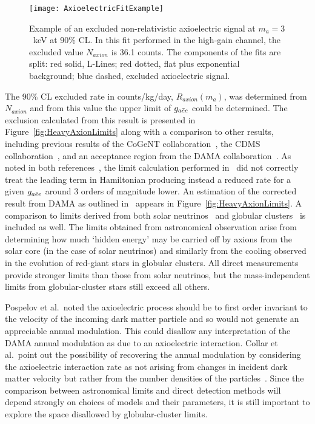 		\begin{figure}
			\centering
			\texttt{[image: AxioelectricFitExample]}
			\caption[Example of an excluded non-relativistic axioelectric signal at $m_{a}=3$~keV at 
			90\% CL]{Example of an excluded non-relativistic axioelectric signal at $m_{a}=3$~keV at 
			90\% CL.  In this fit performed in the high-gain channel, the excluded value $N_{axion}$ 
			is 36.1 counts.  
			The components of the fits are split: red solid, L-Lines; red dotted, flat plus exponential
			background; blue dashed, excluded axioelectric signal.}
			\label{fig:ExampleHeavyAxionFit}
		\end{figure}
			
	The 90\% CL excluded rate in counts/kg/day, $R_{axion}(m_{a})$, was determined from $N_{axion}$
and from this value the upper limit of $g_{a\bar{e}e}$ could be determined.  The exclusion calculated from this result is presented in Figure~\ref{fig:HeavyAxionLimits} 
along with a comparison to other results, including previous results of the CoGeNT collaboration~\cite{Aalseth:2008aa}, the CDMS 
collaboration~\cite{Ahmed2009}, and an acceptance region from the DAMA collaboration~\cite{Bernabei:2005ca}.  As noted in both 
references~\cite{Collar:2009sp,Pospelov:2008jk}, the limit calculation performed in~\cite{Bernabei:2005ca} did not correctly treat the 
leading term in Hamiltonian producing instead a reduced rate for a given $g_{a\bar{e}e}$ around 3 orders of magnitude lower.  An estimation 
of the corrected result from DAMA as outlined in~\cite{Collar:2009sp} appears in Figure~\ref{fig:HeavyAxionLimits}.  A comparison to 
limits derived from both solar neutrinos~\cite{Gondolo09} and globular clusters~\cite{Raffelt95} is included as well.  The limits 
obtained from astronomical observation arise from determining how much `hidden energy' may be carried off by axions from the solar 
core (in the case of solar neutrinos) and similarly from the cooling observed in the evolution of red-giant stars in globular clusters.  All 
direct measurements provide stronger limits than those from solar neutrinos, but the mass-independent limits from globular-cluster 
stars still exceed all others.  
			
	Pospelov et al.~noted the axioelectric process should be to first order invariant to the velocity of the incoming dark matter particle and so would not generate an appreciable annual modulation.  This could disallow any interpretation of the DAMA annual modulation as due to an axioelectric interaction.  Collar et al.~point out the possibility of recovering the annual modulation by considering the axioelectric interaction rate as not arising from changes in incident dark matter velocity but rather from the number densities of the particles~\cite{Collar:2009sp}.  Since the comparison between astronomical limits and direct detection methods will depend strongly on choices of models and their parameters, it is still important to explore the space disallowed by globular-cluster limits.
			
